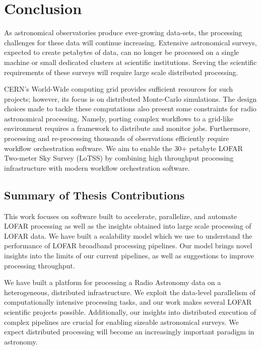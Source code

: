 \chapter{Conclusion}\label{ch:conclusions}


As astronomical observatories produce ever-growing data-sets, the processing challenges for these data will continue increasing. Extensive astronomical surveys, expected to create petabytes of data, can no longer be processed on a single machine or small dedicated clusters at scientific institutions. Serving the scientific requirements of these surveys will require large scale distributed processing. 

CERN's World-Wide computing grid provides sufficient resources for such projects; however, its focus is on distributed Monte-Carlo simulations. The design choices made to tackle these computations also present some constraints for radio astronomical processing. Namely, porting complex workflows to a grid-like environment requires a framework to distribute and monitor jobs. Furthermore, processing and re-processing thousands of observations efficiently require workflow orchestration software. We aim to enable the 30+ petabyte LOFAR Two-meter Sky Survey (\Gls{LoTSS}) by combining high throughput processing infrastructure with modern workflow orchestration software. 

\section{Summary of Thesis Contributions}

This work focuses on software built to accelerate, parallelize, and automate LOFAR processing as well as the insights obtained into large scale processing of LOFAR data. We have built a scalability model which we use to understand the performance of LOFAR broadband processing pipelines. Our model brings novel insights into the limits of our current pipelines, as well as suggestions to improve processing throughput. 

We have built a platform for processing a Radio Astronomy data on a heterogeneous, distributed infrastructure. We exploit the data-level parallelism of computationally intensive processing tasks, and our work makes several LOFAR scientific projects possible. Additionally, our insights into distributed execution of complex pipelines are crucial for enabling sizeable astronomical surveys. We expect distributed processing will become an increasingly important paradigm in astronomy. 

